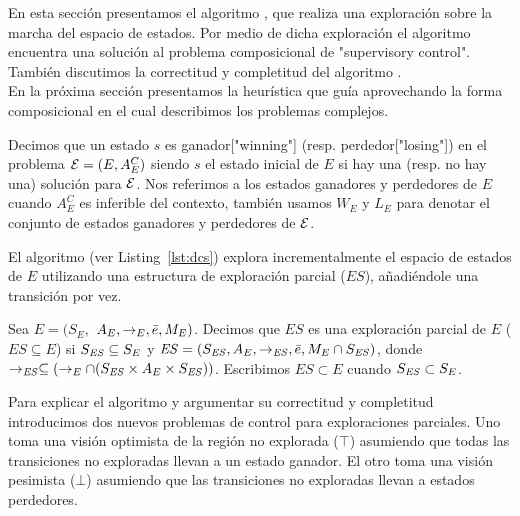 En esta sección presentamos el algoritmo \DCS, que realiza una exploración sobre la marcha del espacio de estados. Por medio de dicha exploración el algoritmo encuentra una solución al problema composicional de "supervisory control". También discutimos la correctitud y completitud del algoritmo \DCS. \\
En la próxima sección presentamos la heurística que guía \DCS aprovechando la forma composicional en el cual describimos los problemas complejos.





\begin{notation}
Decimos que un estado $s$ es ganador["winning"] (resp. perdedor["losing"]) en el problema $\mathcal{E} = 
(E, A_E^C)$ siendo $s$ el estado inicial de $E$ si hay una (resp. no hay una) solución para $\mathcal{E}$. Nos referimos a los estados ganadores y perdedores de $E$ cuando $A_E^C$ es inferible del contexto, también usamos $W_E$ y $L_E$ para denotar el conjunto de estados ganadores y perdedores de $\mathcal{E}$.
\end{notation}

El algoritmo (ver Listing~\ref{lst:dcs}) explora incrementalmente el espacio de estados de $E$ utilizando una estructura de exploración parcial ($ES$), añadiéndole una transición por vez.


\begin{definition}
 \label{def:unexploredTo}
Sea $E = (S_E,$ $A_E, \rightarrow_E, \bar{e}, M_E)$. Decimos que $ES$ es una exploración parcial de $E$ ($ES \subseteq E$) si $S_{\mathit{ES}} \subseteq 
S_E$ y $\mathit{ES} = (S_{\mathit{ES}},A_E, \rightarrow_{\mathit{ES}},\bar{e},M_E 
\cap S_{\mathit{ES}})$, donde $ \rightarrow_{\mathit{ES}} \subseteq (\rightarrow_E \cap 
(S_{\mathit{ES}} \times A_E \times S_{\mathit{ES}}))$. Escribimos $ES \subset E$ cuando $S_{\mathit{ES}} \subset S_E$.
\end{definition}

Para explicar el algoritmo y argumentar su correctitud y completitud introducimos dos nuevos problemas de control para exploraciones parciales. Uno toma una visión optimista de la región no explorada ($\top$) asumiendo que todas las transiciones no exploradas llevan a un estado ganador. El otro toma una visión pesimista ($\bot$) asumiendo que las transiciones no exploradas llevan a estados perdedores.

